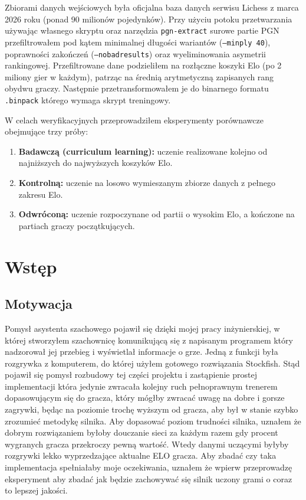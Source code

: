 \documentclass[12pt,a4paper]{report}
\begin{document}
Zbiorami danych wejściowych była oficjalna baza danych serwisu Lichess z marca 2026 roku (ponad 90 milionów pojedynków). Przy użyciu potoku przetwarzania używając własnego skryptu oraz narzędzia \texttt{pgn-extract} surowe partie PGN przefiltrowałem pod kątem minimalnej długości wariantów (\texttt{--minply 40}), poprawności zakończeń (\texttt{--nobadresults}) oraz wyeliminowania asymetrii rankingowej. Przefiltrowane dane podzieliłem na rozłączne koszyki Elo (po 2 miliony gier w każdym), patrząc na średnią arytmetyczną zapisanych rang obydwu graczy. Następnie przetransformowałem je do binarnego formatu \texttt{.binpack} którego wymaga skrypt treningowy.

W celach weryfikacyjnych przeprowadziłem eksperymenty porównawcze obejmujące trzy próby:
\begin{enumerate}
    \item \textbf{Badawczą (curriculum learning):} uczenie realizowane kolejno od najniższych do najwyższych koszyków Elo.
    \item \textbf{Kontrolną:} uczenie na losowo wymieszanym zbiorze danych z pełnego zakresu Elo.
    \item \textbf{Odwróconą:} uczenie rozpoczynane od partii o wysokim Elo, a kończone na partiach graczy początkujących.
\end{enumerate}


\chapter{Wstęp}

\section{Motywacja}

Pomysł asystenta szachowego pojawił się dzięki mojej pracy inżynierskiej, w której stworzyłem szachownicę komunikującą się z napisanym programem który nadzorował jej przebieg i wyświetlał informacje o grze. Jedną z funkcji była rozgrywka z komputerem, do której użyłem gotowego rozwiązania Stockfish. Stąd pojawił się pomysł rozbudowy tej części projektu i zastąpienie prostej implementacji która jedynie zwracała kolejny ruch pełnoprawnym trenerem dopasowującym się do gracza, który mógłby zwracać uwagę na dobre i gorsze zagrywki, będąc na poziomie trochę wyższym od gracza, aby był w stanie szybko zrozumieć metodykę silnika. Aby dopasować poziom trudności silnika, uznałem że dobrym rozwiązaniem byłoby douczanie sieci za każdym razem gdy procent wygranych gracza przekroczy pewną wartość. Wtedy danymi uczącymi byłyby rozgrywki lekko wyprzedzające aktualne ELO gracza. Aby zbadać czy taka implementacja spełniałaby moje oczekiwania, uznałem że wpierw przeprowadzę eksperyment aby zbadać jak będzie zachowywać się silnik uczony grami o coraz to lepszej jakości.
\end{document}
